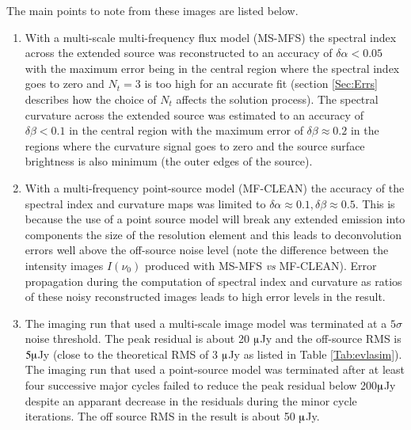 \documentclass[structabstract]{stylefiles/aa}
\renewcommand{\cite}{\citep}
\begin{document}
\clearpage
\noindent The main points to note from these images are listed below.
\begin{enumerate}
\item With a multi-scale multi-frequency flux model (MS-MFS) 
the spectral index across the extended source was reconstructed 
to an accuracy of $\delta\alpha < 0.05$ with the maximum error being in the
central region where the spectral index goes to zero and $N_t=3$ is too high 
for an accurate fit (section \ref{Sec:Errs} describes how the choice of
$N_t$ affects the solution process). 
The spectral curvature across the extended source was estimated to an accuracy of
$\delta\beta<0.1$ in the central region with the maximum error of 
$\delta\beta \approx 0.2$ in the regions 
where the curvature signal goes to zero and the source surface brightness
is also minimum (the outer edges of the source).

\item With a multi-frequency point-source model (MF-CLEAN)
the accuracy of the spectral index and curvature maps was limited to
$\delta\alpha\approx 0.1,\delta\beta\approx 0.5$.
This is because the use of a point source model will break any 
extended emission into components the size of the resolution element
and this leads to deconvolution errors well above the
off-source noise level (note the difference between the
intensity images $I(\nu_0)$ produced with MS-MFS {\it vs} MF-CLEAN).
Error propagation during the computation of spectral index and 
curvature as ratios of these noisy reconstructed images leads to
high error levels in the result.

%
\item The imaging run that used a multi-scale image model was terminated at a $5\sigma$
noise threshold. The peak residual is about 20 $\muup$Jy and the off-source RMS is $5 \muup$Jy
(close to the theoretical RMS of 3 $\muup$Jy as listed in Table \ref{Tab:evlasim}).
The imaging run that used a point-source model was terminated after at least
four successive major cycles failed to reduce the peak residual below 200$\muup$Jy despite
an apparant decrease in the residuals during the minor cycle iterations.
The off source RMS in the result is about 50 $\muup$Jy.

\end{enumerate}
\end{document}
